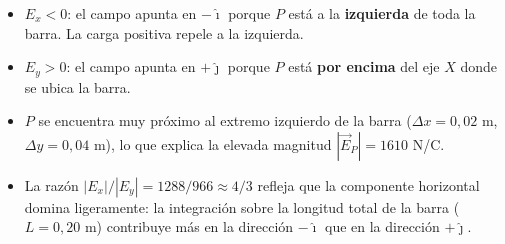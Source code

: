 \documentclass[12pt,letterpaper]{article}
\begin{document}
\begin{itemize}
    \item $E_x < 0$: el campo apunta en $-\hat{\imath}$ porque $P$ est\'a a la \textbf{izquierda} de toda la barra. La carga positiva repele a la izquierda.

    \item $E_y > 0$: el campo apunta en $+\hat{\jmath}$ porque $P$ est\'a \textbf{por encima} del eje $X$ donde se ubica la barra.

    \item $P$ se encuentra muy pr\'oximo al extremo izquierdo de la barra ($\Delta x = 0{,}02$ m, $\Delta y = 0{,}04$ m), lo que explica la elevada magnitud $|\vec{E}_P| = 1610$ N/C.

    \item La raz\'on $|E_x|/|E_y| = 1288/966 \approx 4/3$ refleja que la componente horizontal domina ligeramente: la integraci\'on sobre la longitud total de la barra ($L = 0{,}20$ m) contribuye m\'as en la direcci\'on $-\hat{\imath}$ que en la direcci\'on $+\hat{\jmath}$.
\end{itemize}
\end{document}
